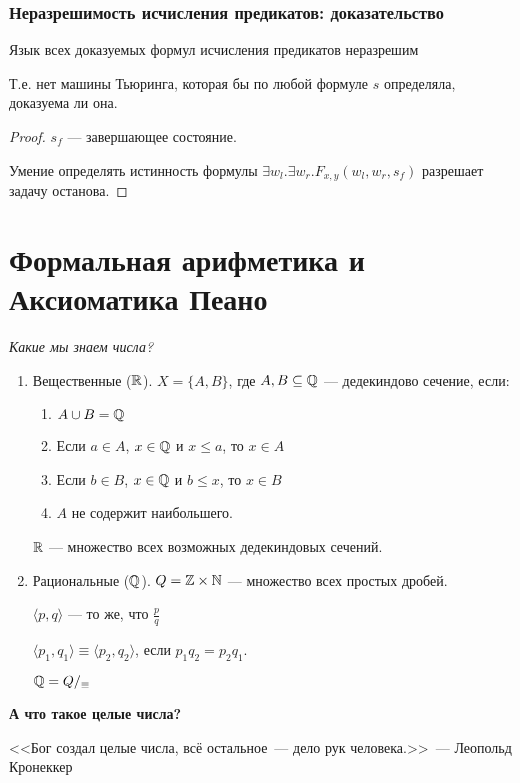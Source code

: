 \subsubsection{Неразрешимость исчисления предикатов: доказательство}
\begin{theorem}
    Язык всех доказуемых формул исчисления предикатов неразрешим

    Т.е. нет машины Тьюринга, которая бы по любой формуле $s$ определяла, доказуема ли она.
\end{theorem}
\begin{proof}
    $s_f$ --- завершающее состояние.

    Умение определять истинность формулы $\exists w_l.\exists w_r.F_{x,y}(w_l,w_r,s_f)$ разрешает задачу останова.
\end{proof}


\section{Формальная арифметика и Аксиоматика Пеано}

\textit{Какие мы знаем числа?}

\begin{enumerate}
    \item Вещественные ($\mathbb{R}$).  $X = \{ A, B \}$, где $A,B \subseteq \mathbb{Q}$ --- дедекиндово сечение, если:
    \begin{enumerate}
        \item $A\cup B = \mathbb{Q}$
        \item Если $a \in A$, $x \in \mathbb{Q}$ и $x \le a$, то $x \in A$
        \item Если $b \in B$, $x \in \mathbb{Q}$ и $b \le x$, то $x \in B$
        \item $A$ не содержит наибольшего.
    \end{enumerate}

    $\mathbb{R}$ --- множество всех возможных дедекиндовых сечений.
    \item Рациональные ($\mathbb{Q}$).
        $Q = \mathbb{Z} \times \mathbb{N}$ --- множество всех простых дробей.

        $\langle p,q \rangle$ --- то же, что $\frac{p}{q}$

        $\langle p_1,q_1 \rangle \equiv \langle p_2, q_2 \rangle$, если $p_1q_2 = p_2q_1$.

        $\mathbb{Q} = Q/_\equiv$
\end{enumerate}


\textbf{А что такое целые числа?}

<<Бог создал целые числа, всё остальное~--- дело рук человека.>>~--- Леопольд Кронеккер

